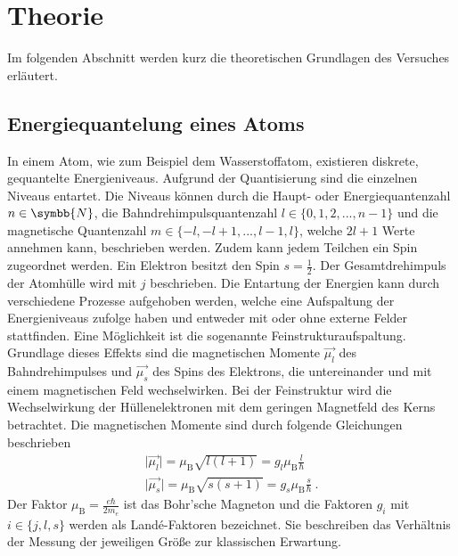 \section{Theorie}
\label{sec:theorie}

    Im folgenden Abschnitt werden kurz die theoretischen Grundlagen des Versuches erläutert.

\subsection{Energiequantelung eines Atoms}

    In einem Atom,
    wie zum Beispiel dem Wasserstoffatom,
    existieren diskrete, gequantelte Energieniveaus.
    Aufgrund der Quantisierung sind die einzelnen Niveaus entartet.
    Die Niveaus können durch die Haupt- oder Energiequantenzahl $n \in \symbb{N}$,
    die Bahndrehimpulsquantenzahl $l \in \{0, 1, 2, ... , n-1\}$ und die magnetische Quantenzahl $m \in \{-l, -l+1, ..., l-1, l\}$,
    welche $2l + 1$ Werte annehmen kann,
    beschrieben werden.
    Zudem kann jedem Teilchen ein Spin zugeordnet werden.
    Ein Elektron besitzt den Spin $s = \frac{1}{2}$.
    Der Gesamtdrehimpuls der Atomhülle wird mit $j$ beschrieben.
    Die Entartung der Energien kann durch verschiedene Prozesse aufgehoben werden,
    welche eine Aufspaltung der Energieniveaus zufolge haben und entweder mit oder ohne externe Felder stattfinden.
    Eine Möglichkeit ist die sogenannte Feinstrukturaufspaltung.
    Grundlage dieses Effekts sind die magnetischen Momente $\vec{\mu_l}$ des Bahndrehimpulses und $\vec{\mu_s}$ des Spins des Elektrons,
    die untereinander und mit einem magnetischen Feld wechselwirken.
    Bei der Feinstruktur wird die Wechselwirkung der Hüllenelektronen mit dem geringen Magnetfeld des Kerns betrachtet.
    Die magnetischen Momente sind durch folgende Gleichungen beschrieben
    \begin{gather}
        \lvert \vec{\mu_l} \rvert = \mu_\text{B} \sqrt{l(l+1)} = g_l \mu_\text{B} \frac{l}{\hbar} 
        \label{eqn:magn_mom_l} \\
        \lvert \vec{\mu_s} \rvert = \mu_\text{B} \sqrt{s(s+1)} = g_s \mu_\text{B} \frac{s}{\hbar} \ .
        \label{eqn:magn_mom_s}
    \end{gather}
    Der Faktor $\mu_\text{B} = \frac{e \hbar}{2 m_{e}}$ ist das Bohr'sche Magneton und die Faktoren $g_{i}$ mit $i \in \{j,l,s\}$ werden als Landé-Faktoren bezeichnet.
    Sie beschreiben das Verhältnis der Messung der jeweiligen Größe zur klassischen Erwartung.
